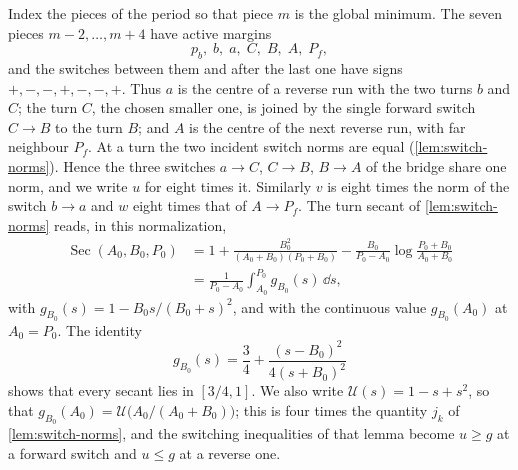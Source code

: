 Index the pieces of the period so that piece $m$ is the global minimum. The seven pieces
$m-2,\dots,m+4$ have active margins
\[
  p_b,\; b,\; a,\; C,\; B,\; A,\; P_f,
\]
and the switches between them and after the last one have signs $+,-,-,+,-,-,+$. Thus $a$ is the
centre of a reverse run with the two turns $b$ and $C$; the turn $C$, the chosen smaller one, is
joined by the single forward switch $C\to B$ to the turn $B$; and $A$ is the centre of the next
reverse run, with far neighbour $P_f$. At a turn the two incident switch norms are equal
(\cref{lem:switch-norms}). Hence the three switches $a\to C$, $C\to B$, $B\to A$ of the bridge
share one norm, and we write $u$ for eight times it. Similarly $v$ is eight times the norm of the
switch $b\to a$ and $w$ eight times that of $A\to P_f$. The turn secant of
\cref{lem:switch-norms} reads, in this normalization,
\begin{equation}\label{eq:ss-secant}
\begin{aligned}
  \operatorname{Sec}(A_0,B_0,P_0)&=1+\frac{B_0^2}{(A_0+B_0)(P_0+B_0)}
   -\frac{B_0}{P_0-A_0}\log\frac{P_0+B_0}{A_0+B_0}\\
   &=\frac{1}{P_0-A_0}\int_{A_0}^{P_0} g_{B_0}(s)\,\dd s,
\end{aligned}
\end{equation}
with $g_{B_0}(s)=1-B_0s/(B_0+s)^2$, and with the continuous value $g_{B_0}(A_0)$ at $A_0=P_0$.
The identity
\begin{equation}\label{eq:ss-g}
  g_{B_0}(s)=\frac34+\frac{(s-B_0)^2}{4(s+B_0)^2}
\end{equation}
shows that every secant lies in $[3/4,1]$. We also write $\mathcal U(s)=1-s+s^2$, so that
$g_{B_0}(A_0)=\mathcal U\bigl(A_0/(A_0+B_0)\bigr)$; this is four times the quantity $j_k$ of
\cref{lem:switch-norms}, and the switching inequalities of that lemma become $u\ge g$ at a forward
switch and $u\le g$ at a reverse one.

